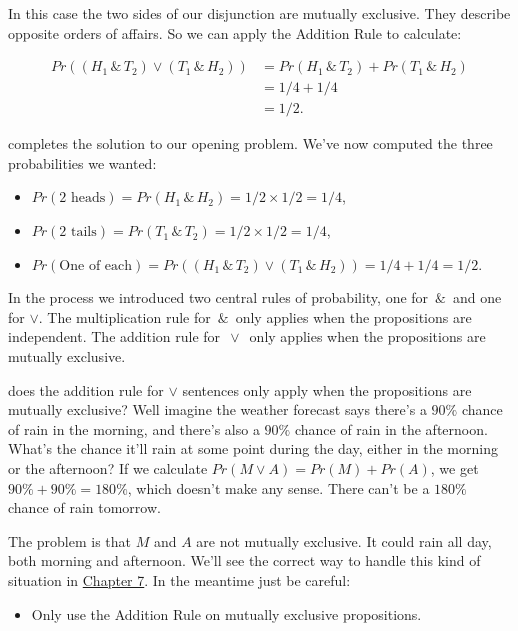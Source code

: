 \documentclass[justified]{tufte-book}
\providecommand{\tightlist}{%
  \setlength{\itemsep}{0pt}\setlength{\parskip}{0pt}}
\newenvironment{warning}{\begin{itemize}\item[\faBan]}{\end{itemize}}
\theoremstyle{definition}
\theoremstyle{definition}
\theoremstyle{definition}
\theoremstyle{remark}
\begin{document}
In this case the two sides of our disjunction are mutually exclusive.
They describe opposite orders of affairs. So we can apply the Addition
Rule to calculate:

\[
  \begin{aligned}
    Pr((H_1 \,\&\, T_2) \vee (T_1 \,\&\, H_2)) 
      &= Pr(H_1 \,\&\, T_2) + Pr(T_1 \,\&\, H_2)\\
      &= 1/4 + 1/4\\
      &= 1/2.
  \end{aligned}      
\]

 completes the solution to our opening problem. We've
now computed the three probabilities we wanted:

\begin{itemize}
\tightlist
\item
  \(Pr(\mbox{2 heads}) = Pr(H_1 \,\&\, H_2) = 1/2 \times 1/2 = 1/4\),
\item
  \(Pr(\mbox{2 tails}) = Pr(T_1 \,\&\, T_2) = 1/2 \times 1/2 = 1/4\),
\item
  \(Pr(\mbox{One of each}) = Pr((H_1 \,\&\, T_2) \vee (T_1 \,\&\, H_2)) = 1/4 + 1/4 = 1/2\).
\end{itemize}

In the process we introduced two central rules of probability, one for
\(\,\&\,\) and one for \(\vee\). The multiplication rule for \(\,\&\,\)
only applies when the propositions are independent. The addition rule
for \(\,\vee\,\) only applies when the propositions are mutually
exclusive.

 does the addition rule for \(\vee\) sentences only
apply when the propositions are mutually exclusive? Well imagine the
weather forecast says there's a \(90\%\) chance of rain in the morning,
and there's also a \(90\%\) chance of rain in the afternoon. What's the
chance it'll rain at some point during the day, either in the morning or
the afternoon? If we calculate \(Pr(M \vee A) = Pr(M) + Pr(A)\), we get
\(90\% + 90\% = 180\%\), which doesn't make any sense. There can't be a
\(180\%\) chance of rain tomorrow.

The problem is that \(M\) and \(A\) are not mutually exclusive. It could
rain all day, both morning and afternoon. We'll see the correct way to
handle this kind of situation in
\protect\hyperlink{calculating-probabilities-part-ii}{Chapter 7}. In the
meantime just be careful:

\begin{warning}
Only use the Addition Rule on mutually exclusive propositions.
\end{warning}
\end{document}
